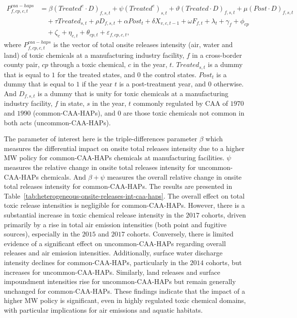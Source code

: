 \documentclass[12pt, english]{article}
\begin{document}
    \begin{align}
        P_{f,cp,c,t}^{caa-haps} &= \beta (Treated^{e} \cdot D)_{f,s,t} + \psi (Treated^{e})_{s,t} + \vartheta (Treated \cdot D)_{f,s,t} + \mu (Post \cdot D)_{f,s,t} \nonumber \\
        &\quad + \tau Treated_{s,t} + \rho D_{f,s,t} + \alpha Post_{t} + \delta X_{v,c,t-1} + \omega F_{f,t} + \lambda_{t} + \gamma_{f} + \phi_{cp} \nonumber \\
        &\quad + \zeta_{c} + \eta_{c,t} + \theta_{cp,t} + \varepsilon_{f,cp,c,t},\label{eq:heterogeneous-onsite-releases-intensity-caahaps}
    \end{align}
    where $P_{f,cp,c,t}^{caa-haps}$ is the vector of total onsite releases intensity (air, water and land) of toxic chemicals at a manufacturing industry facility, $f$ in a cross-border county pair, $cp$ through a toxic chemical, $c$ in the year, $t$. $Treated_{s,t}$ is a dummy that is equal to $1$ for the treated states, and $0$ the control states. $Post_{t}$ is a dummy that is equal to $1$ if the year $t$ is a post-treatment year, and $0$ otherwise. And $D_{f,s,t}$ is a dummy that is unity for toxic chemicals at a manufacturing industry facility, $f$ in state, $s$ in the year, $t$ commonly regulated by CAA of $1970$ and $1990$ (common-CAA-HAPs), and $0$ are those toxic chemicals not common in both acts (uncommon-CAA-HAPs).
    

    The parameter of interest here is the triple-differences parameter $\beta$ which measures the differential impact on onsite total releases intensity due to a higher MW policy for common-CAA-HAPs chemicals at manufacturing facilities. $\psi$ measures the relative change in onsite total releases intensity for uncommon-CAA-HAPs chemicals. And $\beta + \psi$ measures the overall relative change in onsite total releases intensity for common-CAA-HAPs. The results are presented in Table~\ref{tab:heterogeneous-onsite-releases-int-caa-haps}. The overall effect on total toxic release intensities is negligible for common-CAA-HAPs. However, there is a substantial increase in toxic chemical release intensity in the $2017$ cohorts, driven primarily by a rise in total air emission intensities (both point and fugitive sources), especially in the $2015$ and $2017$ cohorts. Conversely, there is limited evidence of a significant effect on uncommon-CAA-HAPs regarding overall releases and air emission intensities. Additionally, surface water discharge intensity declines for common-CAA-HAPs, particularly in the $2014$ cohorts, but increases for uncommon-CAA-HAPs. Similarly, land releases and surface impoundment intensities rise for uncommon-CAA-HAPs but remain generally unchanged for common-CAA-HAPs. These findings indicate that the impact of a higher MW policy is significant, even in highly regulated toxic chemical domains, with particular implications for air emissions and aquatic habitats.
    
\end{document}
